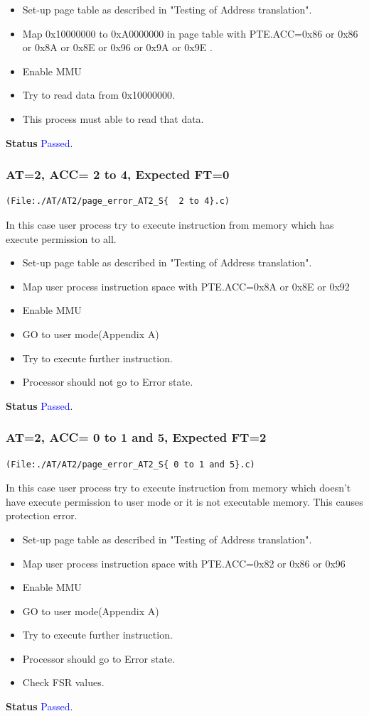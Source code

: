 \documentclass[12pt,a4paper]{article}
\begin{document}
\begin{itemize}
\item Set-up page table as described in "Testing of Address translation".
\item Map 0x10000000 to 0xA0000000 in page table with PTE.ACC=0x86 or 0x86 or 0x8A or 0x8E  or 0x96 or 0x9A or 0x9E .
\item Enable MMU 
\item Try to read data from 0x10000000.
\item This process must able to read that data. 
\end{itemize}
\textbf{Status} \textcolor{blue}{Passed}.

\subsubsection{ AT=2, ACC= 2 to 4, Expected FT=0}
\begin{lstlisting}
(File:./AT/AT2/page_error_AT2_S{  2 to 4}.c)
\end{lstlisting}
In this case user process try to execute instruction from memory which has  execute permission to all. 

\begin{itemize}
\item Set-up page table as described in "Testing of Address translation".
\item Map user process instruction space with PTE.ACC=0x8A or 0x8E or 0x92
\item Enable MMU
\item GO to user mode(Appendix A) 
\item Try to execute further instruction.
\item Processor should not go to Error state. 
\end{itemize}
\textbf{Status} \textcolor{blue}{Passed}.
\subsubsection{ AT=2, ACC= 0 to 1 and 5, Expected FT=2}
\begin{lstlisting}
(File:./AT/AT2/page_error_AT2_S{ 0 to 1 and 5}.c)
\end{lstlisting}
In this case user process try to execute instruction from memory which doesn't have  execute permission to user mode or it is not executable memory. This causes protection error.

\begin{itemize}
\item Set-up page table as described in "Testing of Address translation".
\item Map user process instruction space with PTE.ACC=0x82 or 0x86 or 0x96
\item Enable MMU
\item GO to user mode(Appendix A) 
\item Try to execute further instruction.
\item Processor should go to Error state. 
\item Check FSR values.
\end{itemize}
\textbf{Status} \textcolor{blue}{Passed}.
\end{document}
